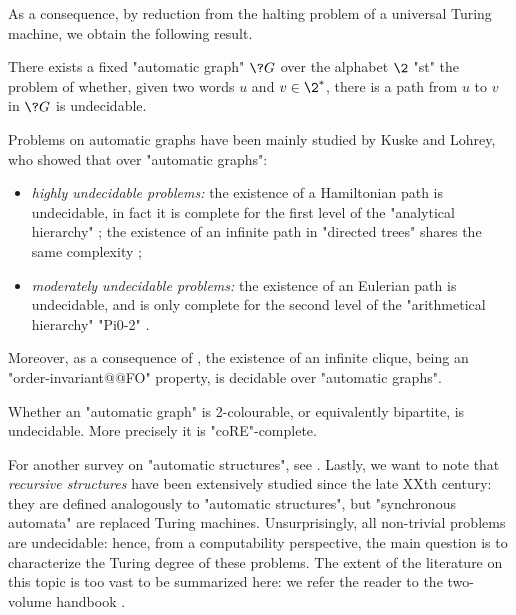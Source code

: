 As a consequence, by reduction from the halting problem of a universal Turing machine, 
we obtain the following result.
\begin{proposition}
	There exists a fixed "automatic graph" $\?G$ over the alphabet $\2$ "st"
	the problem of whether, given two words $u$ and $v \in \2^*$, there is a path from
	$u$ to $v$ in $\?G$ is undecidable.
\end{proposition}

Problems on automatic graphs have been mainly studied by Kuske and Lohrey, who showed that over "automatic graphs":
\begin{itemize}
	\item \emph{highly undecidable problems:} the existence of a Hamiltonian path
		is undecidable, in fact it is complete for the first level of the "analytical hierarchy"
		\cite[Theorem~3.2]{KuskeLohrey2010AutomaticGraphs};
		the existence of an infinite path in "directed trees" shares the same complexity
		\cite[Theorem~3.6]{KuskeLohrey2010AutomaticGraphs};
	\item \emph{moderately undecidable problems:}
		the existence of an Eulerian path is undecidable, and is only complete for
		the second level of the "arithmetical hierarchy" "Pi0-2" \cite[Theorem~4.13]{KuskeLohrey2010AutomaticGraphs}.
\end{itemize}

Moreover, as a consequence of , the existence of an infinite clique,
being an "order-invariant@@FO" property, is decidable over "automatic graphs".

\begin{proposition}
	Whether an "automatic graph" is 2-colourable, or equivalently bipartite, is undecidable.
	More precisely it is "coRE"-complete.
\end{proposition}

For another survey on "automatic structures", see \cite{Gradel2020AutomaticStructures}.
Lastly, we want to note that \emph{recursive structures} have been extensively studied
since the late XXth century: they are defined analogously to "automatic structures",
but "synchronous automata" are replaced Turing machines.
Unsurprisingly, all non-trivial problems are undecidable: hence, from a computability perspective,
the main question is to characterize the Turing degree of these problems.
The extent of the literature on this topic is too vast to be summarized here:
we refer the reader to the two-volume handbook \cite{ErshovGoncharovNerodeRemmelMarek1998Handbook1,ErshovGoncharovNerodeRemmelMarek1998Handbook2}.